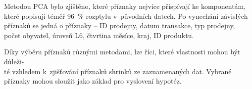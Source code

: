 Metodou PCA bylo zjištěno, které příznaky nejvíce přispívají ke komponentám, které popisují téměř 96~\% rozptylu v~původních datech. Po vynechání závislých příznaků se jedná o příznaky -- ID prodejny, datum transakce, typ prodejny, počet obyvatel, úroveň L6, čtvrtina měsíce, kraj, ID produktu. 


Díky výběru příznaků různými metodami, lze říci, které vlastnosti mohou být důleži-\\té vzhledem k~zjišťování příznaků shrinků ze zaznamenaných dat. Vybrané příznaky mohou sloužit jako základ pro vyslovení hypotéz.

    

